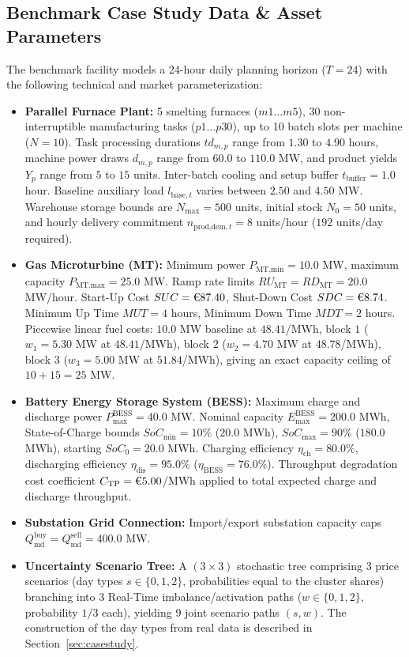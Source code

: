\documentclass[journal]{IEEEtran}
\begin{document}
\subsection{Benchmark Case Study Data \& Asset Parameters}
The benchmark facility models a 24-hour daily planning horizon ($T=24$) with the following technical and market parameterization:
\begin{itemize}
    \item \textbf{Parallel Furnace Plant:} 5 smelting furnaces ($m1 \dots m5$), 30 non-interruptible manufacturing tasks ($p1 \dots p30$), up to 10 batch slots per machine ($N=10$). Task processing durations $td_{m,p}$ range from $1.30$ to $4.90$ hours, machine power draws $d_{m,p}$ range from $60.0$ to $110.0$ MW, and product yields $Y_p$ range from $5$ to $15$ units. Inter-batch cooling and setup buffer $t_{\text{buffer}} = 1.0$ hour. Baseline auxiliary load $l_{\text{base},t}$ varies between $2.50$ and $4.50$ MW. Warehouse storage bounds are $N_{\text{max}} = 500$ units, initial stock $N_0 = 50$ units, and hourly delivery commitment $n_{\text{prod,dem},t} = 8$ units/hour ($192$ units/day required).
    \item \textbf{Gas Microturbine (MT):} Minimum power $P_{\text{MT,min}} = 10.0$ MW, maximum capacity $P_{\text{MT,max}} = 25.0$ MW. Ramp rate limits $RU_{\text{MT}} = RD_{\text{MT}} = 20.0$ MW/hour. Start-Up Cost $SUC = \text{\texteuro}87.40$, Shut-Down Cost $SDC = \text{\texteuro}8.74$. Minimum Up Time $MUT = 4$ hours, Minimum Down Time $MDT = 2$ hours. Piecewise linear fuel costs: $10.0$ MW baseline at \texteuro $48.41$/MWh, block $1$ ($w_1 = 5.30$ MW at \texteuro $48.41$/MWh), block $2$ ($w_2 = 4.70$ MW at \texteuro $48.78$/MWh), block $3$ ($w_3 = 5.00$ MW at \texteuro $51.84$/MWh), giving an exact capacity ceiling of $10 + 15 = 25$ MW.
    \item \textbf{Battery Energy Storage System (BESS):} Maximum charge and discharge power $P_{\text{max}}^{\text{BESS}} = 40.0$ MW. Nominal capacity $E_{\text{max}}^{\text{BESS}} = 200.0$ MWh, State-of-Charge bounds $SoC_{\text{min}} = 10\%$ ($20.0$ MWh), $SoC_{\text{max}} = 90\%$ ($180.0$ MWh), starting $SoC_0 = 20.0$ MWh. Charging efficiency $\eta_{\text{ch}} = 80.0\%$, discharging efficiency $\eta_{\text{dis}} = 95.0\%$ ($\eta_{\text{BESS}} = 76.0\%$). Throughput degradation cost coefficient $C_{\text{TP}} = \text{\texteuro}5.00$/MWh applied to total expected charge and discharge throughput.
    \item \textbf{Substation Grid Connection:} Import/export substation capacity caps $Q_{\text{md}}^{\text{buy}} = Q_{\text{md}}^{\text{sell}} = 400.0$ MW.
    \item \textbf{Uncertainty Scenario Tree:} A $(3 \times 3)$ stochastic tree comprising 3 price scenarios (day types $s \in \{0, 1, 2\}$, probabilities equal to the cluster shares) branching into 3 Real-Time imbalance/activation paths ($w \in \{0, 1, 2\}$, probability $1/3$ each), yielding 9 joint scenario paths $(s,w)$. The construction of the day types from real data is described in Section~\ref{sec:casestudy}.
\end{itemize}
\end{document}

